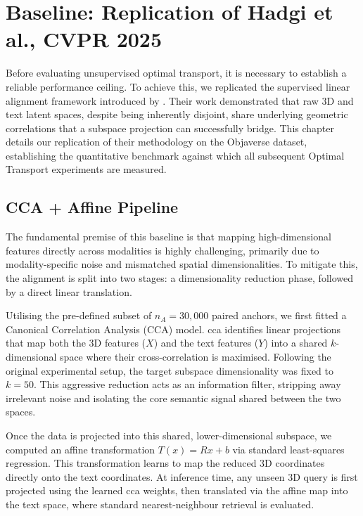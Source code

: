 \chapter{Baseline: Replication of Hadgi et al., CVPR 2025}
\label{ch:baseline}

Before evaluating unsupervised optimal transport, it is necessary to establish a reliable performance ceiling. To achieve this, we replicated the supervised linear alignment framework introduced by \textcite{hadgi2025escaping}. Their work demonstrated that raw 3D and text latent spaces, despite being inherently disjoint, share underlying geometric correlations that a subspace projection can successfully bridge. This chapter details our replication of their methodology on the Objaverse dataset, establishing the quantitative benchmark against which all subsequent Optimal Transport experiments are measured.

\section{CCA + Affine Pipeline}
\label{sec:cca_affine}

The fundamental premise of this baseline is that mapping high-dimensional features directly across modalities is highly challenging, primarily due to modality-specific noise and mismatched spatial dimensionalities. To mitigate this, the alignment is split into two stages: a dimensionality reduction phase, followed by a direct linear translation.

Utilising the pre-defined subset of $n_A = 30{,}000$ paired anchors, we first fitted a Canonical Correlation Analysis (CCA) model. \gls{cca} identifies linear projections that map both the 3D features ($X$) and the text features ($Y$) into a shared $k$-dimensional space where their cross-correlation is maximised. Following the original experimental setup, the target subspace dimensionality was fixed to $k = 50$. This aggressive reduction acts as an information filter, stripping away irrelevant noise and isolating the core semantic signal shared between the two spaces.

Once the data is projected into this shared, lower-dimensional subspace, we computed an affine transformation $T(x) = Rx + b$ via standard least-squares regression. This transformation learns to map the reduced 3D coordinates directly onto the text coordinates. At inference time, any unseen 3D query is first projected using the learned \gls{cca} weights, then translated via the affine map into the text space, where standard nearest-neighbour retrieval is evaluated.

